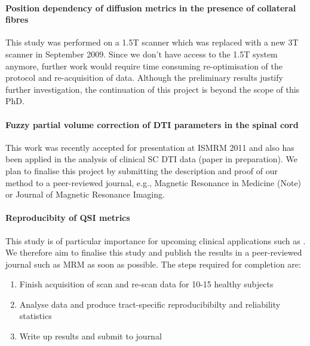 \paragraph*{Position dependency of diffusion metrics in the presence of collateral fibres}
This study was performed on a 1.5T scanner which was replaced with a new 3T scanner in September 2009. Since we don't have access to the 1.5T system anymore, further work would require time consuming re-optimisation of the protocol and re-acquisition of data. Although the preliminary results justify further investigation, the continuation of this project is beyond the scope of this PhD.
\paragraph*{Fuzzy partial volume correction of DTI parameters in the spinal cord}
This work was recently accepted for presentation at ISMRM 2011 and also has been applied in the analysis of clinical \gls{SC} \gls{DTI} data (paper in preparation). We plan to finalise this project by submitting the description and proof of our method to a peer-reviewed journal, e.g., Magnetic Resonance in Medicine (Note) or Journal of Magnetic Resonance Imaging.
\paragraph*{Reproducibity of QSI metrics}
This study is of particular importance for upcoming clinical applications such as \cite{Ciccarelli:2011}. We therefore aim to finalise this study and publish the results in a peer-reviewed journal such as MRM as soon as possible. The steps required for completion are:
\begin{enumerate}
  \item Finish acquisition of scan and re-scan data for 10-15 healthy subjects
  \item Analyse data and produce tract-specific reproducibibilty and reliability statistics
  \item Write up results and submit to journal    
\end{enumerate}             
